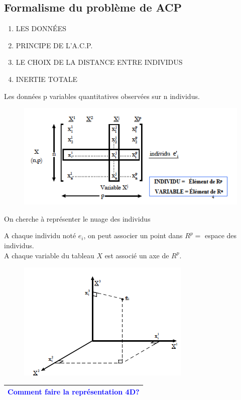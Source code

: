 \documentclass[11pt]{beamer}
\begin{document}
\subsection{Formalisme du problème de ACP}
\begin{frame}{}

\begin{enumerate}
\item LES DONNÉES
\item PRINCIPE DE L’A.C.P.
\item LE CHOIX DE LA DISTANCE ENTRE INDIVIDUS
\item INERTIE TOTALE
\end{enumerate}

\end{frame}

\begin{frame}{Les données}
p variables quantitatives observées sur n individus.

\begin{figure}
\includegraphics[scale=0.7]{schema3.png} 
\end{figure}

\end{frame}


\begin{frame}{On cherche à représenter le nuage des individus}

A chaque individu noté $e_i$, on peut associer un point dans
$R^p =$ espace des individus.\\

A chaque variable du tableau $X$ est associé un axe de $R^p$.

\begin{figure}
\includegraphics[scale=0.5]{schema4.png} 
\end{figure}
\centering
\begin{tabular}{|c|}
\hline 
\textcolor{blue}{{\Large Comment faire la représentation  4D?}}\\ 
\hline 
\end{tabular} 
\end{frame}
\end{document}
